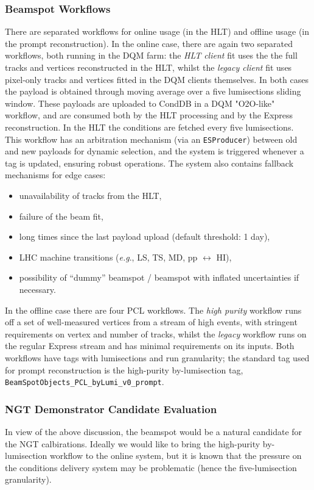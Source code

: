 \subsubsection{Beamspot Workflows}

There are separated workflows for
online usage (in the HLT) and
offline usage (in the prompt reconstruction).
In the online case, there are again two separated workflows, both running in the DQM farm:
the \emph{HLT client} fit uses the the full tracks and vertices reconstructed in the HLT, whilst
the \emph{legacy client} fit uses pixel-only tracks and vertices fitted in the DQM clients themselves.
In both cases the payload is obtained through moving average over a five lumisections sliding window.
These payloads are uploaded to CondDB in a DQM "O2O-like" workflow,
and
are consumed both by the HLT processing and by the Express reconstruction.
In the HLT the conditions are fetched every five lumisections.
This workflow has an arbitration mechanism (via an \texttt{ESProducer}) between old and new payloads for dynamic selection, and the system is triggered whenever a tag is updated, ensuring robust operations.
The system also contains fallback mechanisms for edge cases:
\begin{itemize}
\item unavailability of tracks from the HLT,
\item failure of the beam fit,
\item long times since the last payload upload (default threshold: 1 day),
\item LHC machine transitions (\textit{e.g}., LS, TS, MD, pp $\leftrightarrow$ HI),
\item possibility of ``dummy'' beamspot / beamspot with inflated uncertainties if necessary.
\end{itemize}
In the offline case there are four PCL workflows.
The \emph{high purity} workflow runs off a set of well-measured vertices from a stream of high \HT events,
with stringent requirements on vertex \PT and number of tracks, whilst
the \emph{legacy} workflow runs on the regular Express stream and has minimal requirements on its inputs.
Both workflows have tags with lumisections and run granularity;
the standard tag used for prompt reconstruction is the high-purity by-lumisection tag, \texttt{BeamSpotObjects\_PCL\_byLumi\_v0\_prompt}.

\subsubsection{NGT Demonstrator Candidate Evaluation}
In view of the above discussion, the beamspot would be a natural candidate for the NGT calbirations.
Ideally we would like to bring the high-purity by-lumisection workflow to the online system,
but it is known that the pressure on the conditions delivery system may be problematic (hence the five-lumisection granularity).

